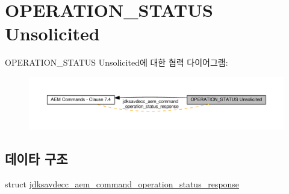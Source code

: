\hypertarget{group__command__operation__status__response}{}\section{O\+P\+E\+R\+A\+T\+I\+O\+N\+\_\+\+S\+T\+A\+T\+US Unsolicited}
\label{group__command__operation__status__response}
O\+P\+E\+R\+A\+T\+I\+O\+N\+\_\+\+S\+T\+A\+T\+US Unsolicited에 대한 협력 다이어그램\+:
\nopagebreak
\begin{figure}[H]
\begin{center}
\leavevmode
\includegraphics[width=350pt]{group__command__operation__status__response}
\end{center}
\end{figure}
\subsection*{데이타 구조}
\begin{DoxyCompactItemize}
\item 
struct \hyperlink{structjdksavdecc__aem__command__operation__status__response}{jdksavdecc\+\_\+aem\+\_\+command\+\_\+operation\+\_\+status\+\_\+response}
\end{DoxyCompactItemize}
